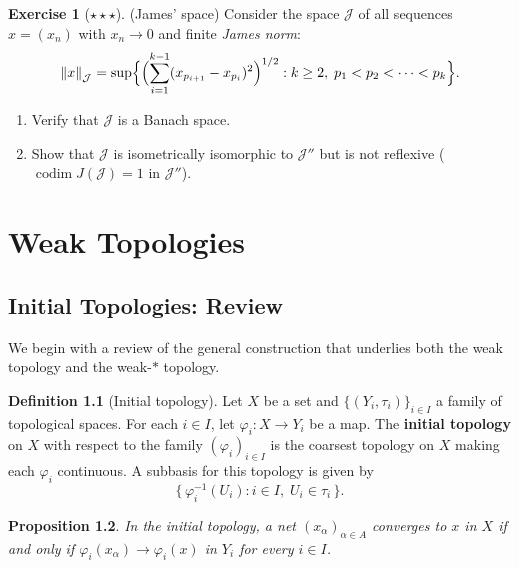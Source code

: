 \documentclass[a4paper,12pt]{book}
\DeclareMathOperator{\codim}{codim}
\newcommand{\norm}[1]{\left\| #1 \right\|}
\theoremstyle{definition}
\newtheorem{definition}{Definition}[chapter]
\newtheorem{exercise}{Exercise}[chapter]
\theoremstyle{plain}
\newtheorem{proposition}[definition]{Proposition}
\theoremstyle{remark}
\begin{document}
\begin{exercise}[$\star\star\star$]\label{exo:james-space}
(James' space) Consider the space $\mathcal{J}$ of all sequences $x=(x_n)$ with
$x_n\to 0$ and finite \emph{James norm}:
\[
  \norm{x}_{\mathcal{J}} = \sup\Bigl\{
    \Bigl(\sum_{i=1}^{k-1}(x_{p_{i+1}}-x_{p_i})^2\Bigr)^{1/2}:
    k\ge 2,\; p_1<p_2<\cdots<p_k
  \Bigr\}.
\]
\begin{enumerate}[label=(\alph*)]
  \item Verify that $\mathcal{J}$ is a Banach space.
  \item Show that $\mathcal{J}$ is isometrically isomorphic to $\mathcal{J}''$
        but is not reflexive ($\codim J(\mathcal{J})=1$ in $\mathcal{J}''$).
\end{enumerate}
\end{exercise}


\chapter{Weak Topologies}\label{ch:weak-topologies}
\minitoc

\section{Initial Topologies: Review}\label{sec:initial-topology}

We begin with a review of the general construction that underlies both the
weak topology and the weak-$*$ topology.

\begin{definition}[Initial topology]\label{def:initial-topology}
Let $X$ be a set and $\{(Y_i,\tau_i)\}_{i\in I}$ a family of topological
spaces.  For each $i\in I$, let $\varphi_i: X\to Y_i$ be a map.  The
\textbf{initial topology} on $X$ with respect to the family
$(\varphi_i)_{i\in I}$ is the coarsest topology on $X$ making each
$\varphi_i$ continuous.  A subbasis for this topology is given by
\[
  \bigl\{\,\varphi_i^{-1}(U_i) : i\in I,\; U_i\in\tau_i\,\bigr\}.
\]
\end{definition}

\begin{proposition}\label{prop:initial-convergence}
In the initial topology, a net $(x_\alpha)_{\alpha\in A}$ converges to $x$
in $X$ if and only if $\varphi_i(x_\alpha)\to\varphi_i(x)$ in $Y_i$ for
every $i\in I$.
\end{proposition}
\end{document}
